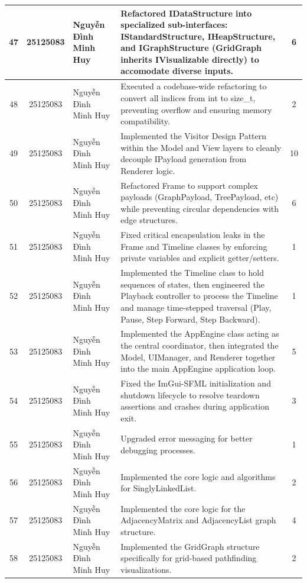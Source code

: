 \begin{center}
\begin{longtable}{|c|c|p{3.2cm}|p{6.5cm}|c|}
47 & 25125083 & Nguyễn Đình Minh Huy & Refactored IDataStructure into specialized sub-interfaces: IStandardStructure, IHeapStructure, and IGraphStructure (GridGraph inherits IVisualizable directly) to accomodate diverse inputs. & 6 \\ \hline
48 & 25125083 & Nguyễn Đình Minh Huy & Executed a codebase-wide refactoring to convert all indices from int to size\_t, preventing overflow and ensuring memory compatibility. & 2 \\ \hline
49 & 25125083 & Nguyễn Đình Minh Huy & Implemented the Visitor Design Pattern within the Model and View layers to cleanly decouple IPayload generation from Renderer logic. & 10 \\ \hline
50 & 25125083 & Nguyễn Đình Minh Huy & Refactored Frame to support complex payloads (GraphPayload, TreePayload, etc) while preventing circular dependencies with edge structures. & 6 \\ \hline
51 & 25125083 & Nguyễn Đình Minh Huy & Fixed critical encapsulation leaks in the Frame and Timeline classes by enforcing private variables and explicit getter/setters. & 1 \\ \hline
52 & 25125083 & Nguyễn Đình Minh Huy & Implemented the Timeline class to hold sequences of states, then engineered the Playback controller to process the Timeline and manage time-stepped traversal (Play, Pause, Step Forward, Step Backward). & 1 \\ \hline
53 & 25125083 & Nguyễn Đình Minh Huy & Implemented the AppEngine class acting as the central coordinator, then integrated the Model, UIManager, and Renderer together into the main AppEngine application loop. & 5 \\ \hline
54 & 25125083 & Nguyễn Đình Minh Huy & Fixed the ImGui-SFML initialization and shutdown lifecycle to resolve teardown assertions and crashes during application exit. & 3 \\ \hline
55 & 25125083 & Nguyễn Đình Minh Huy & Upgraded error messaging for better debugging processes. & 1 \\ \hline
56 & 25125083 & Nguyễn Đình Minh Huy & Implemented the core logic and algorithms for SinglyLinkedList. & 2 \\ \hline
57 & 25125083 & Nguyễn Đình Minh Huy & Implemented the core logic for the AdjacencyMatrix and AdjacencyList graph structure. & 4 \\ \hline
58 & 25125083 & Nguyễn Đình Minh Huy & Implemented the GridGraph structure specifically for grid-based pathfinding visualizations. & 2 \\ \hline

\end{longtable}
\end{center}
